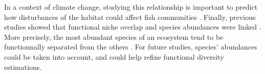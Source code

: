 In a context of climate change, studying this relationship is important to predict how disturbances of the habitat could affect fish communities \citep{brindamour2011}. Finally, previous studies showed that functional niche overlap and species abundances were linked \citep{aneeshkumar2017,mason2008}. More precisely, the most abundant species of an ecosystem tend to be functionnally separated from the others \citep{farre2016}. For future studies, species' abundances could be taken into account, and could help refine functional diversity estimations. 




